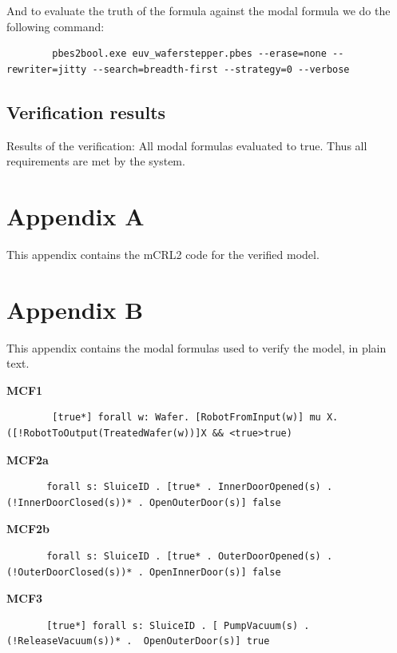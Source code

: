 \documentclass[12pt]{report}
\begin{document}
    And to evaluate the truth of the formula against the modal formula we do the following command:\\
    \begin{lstlisting}
        pbes2bool.exe euv_waferstepper.pbes --erase=none --rewriter=jitty --search=breadth-first --strategy=0 --verbose
    \end{lstlisting} 
    
	\section{Verification results}
	Results of the verification: All modal formulas evaluated to true. Thus all requirements are met by the system.
	
	\chapter{Appendix A}
	This appendix contains the mCRL2 code for the verified model.
	
	

	
	\chapter{Appendix B}
	This appendix contains the modal formulas used to verify the model, in plain text.

    \textbf{MCF1}
    \begin{lstlisting}
    	[true*] forall w: Wafer. [RobotFromInput(w)] mu X. ([!RobotToOutput(TreatedWafer(w))]X && <true>true)
    \end{lstlisting}

    \textbf{MCF2a}
    \begin{lstlisting}
       forall s: SluiceID . [true* . InnerDoorOpened(s) . (!InnerDoorClosed(s))* . OpenOuterDoor(s)] false
       \end{lstlisting}

    \textbf{MCF2b}
    \begin{lstlisting}
       forall s: SluiceID . [true* . OuterDoorOpened(s) . (!OuterDoorClosed(s))* . OpenInnerDoor(s)] false
       \end{lstlisting}

    \textbf{MCF3}
    \begin{lstlisting}
       [true*] forall s: SluiceID . [ PumpVacuum(s) . (!ReleaseVacuum(s))* .  OpenOuterDoor(s)] true
       \end{lstlisting}
\end{document}
